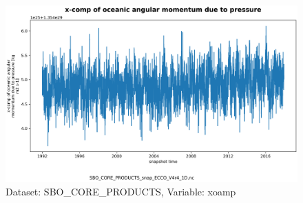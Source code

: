 \begin{figure}[H]
\centering
\includegraphics[scale=0.55]{../images/plots/v4r4/oneD_plots/SBO_Core_Products/xoamp.png}
\caption{Dataset: SBO\_CORE\_PRODUCTS, Variable: xoamp}
\label{tab:table-SBO_CORE_PRODUCTS_xoamp-Plot}
\end{figure}
\newpage
\pagebreak
